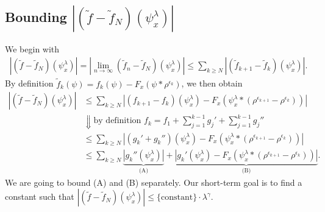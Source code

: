 \subsection*{Bounding \(|(\tilde f - \tilde f_N) (\psi^\lambda_x)|\)} 

We begin with
\begin{align*}
    |(\tilde f - \tilde f_N) (\psi^\lambda_x)| = |\lim_{n \to \infty} (\tilde f_n - \tilde f_N) (\psi^\lambda_x)| \leq \sum_{k \geq N}|(\tilde f_{k+1} - \tilde f_k)(\psi^\lambda_x)|.
\end{align*}
By definition \(\tilde f_k(\psi) = f_k(\psi) - F_x(\psi * \rho^{\epsilon_k})\), we then obtain 
\begin{align*}
    |(\tilde f - \tilde f_N) (\psi^\lambda_x)| 
    &\leq \sum_{k \geq N} |(f_{k+1} - f_k)(\psi^\lambda_x) - F_x(\psi^\lambda_x * (\rho^{\epsilon_{k+1}} - \rho^{\epsilon_k}))| \\
    &\Downarrow \text{by definition \(f_k = f_1 + \sum^{k-1}_{j=1} g_j' + \sum^{k-1}_{j=1}g_j''\)}\\
    &\leq
    \sum_{k \geq N} |(g_k' + g_k'')(\psi^{\lambda}_x) - F_x(\psi^\lambda_x * (\rho^{\epsilon_{k+1}} - \rho^{\epsilon_k}))| \\
    &\leq \sum_{k \geq N} \underbrace{|g_k''(\psi^{\lambda}_x)|}_{\text{(A)}} + \underbrace{ |g_k'(\psi^\lambda_x) - F_x(\psi^\lambda_x * (\rho^{\epsilon_{k+1}} - \rho^{\epsilon_k}))|}_{\text{(B)}}.
\end{align*}
We are going to bound (A) and (B) separately. Our short-term goal is to find a constant such that \(|(\tilde f - \tilde f_N) (\psi^\lambda_x)| \leq \{\mathrm{constant}\} \cdot \lambda^{\gamma}\). 

\vspace{0.5em}

